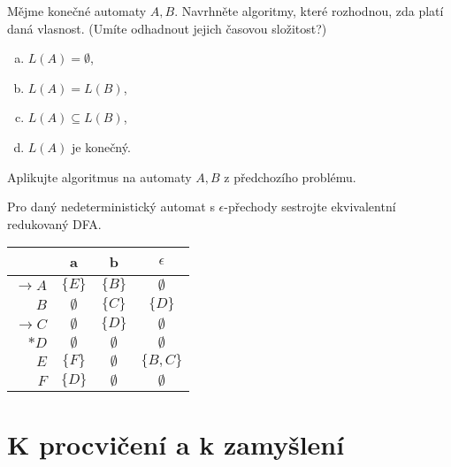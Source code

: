 \documentclass[a4paper,12pt]{amsart}
\begin{document}
\begin{problem}

    Mějme konečné automaty $A,B$. Navrhněte algoritmy, které rozhodnou, zda platí daná vlasnost. (Umíte odhadnout jejich časovou složitost?)
    
    \begin{multicols}{4}
    
        \begin{enumerate}[(a)]\setlength\itemsep{6pt}
            \item $L(A)=\emptyset$,
            \item $L(A)=L(B)$,
            \item $L(A)\subseteq L(B)$,
            \item $L(A)$ je konečný.
        \end{enumerate}

    \end{multicols}

    Aplikujte algoritmus na automaty $A,B$ z předchozího problému.

    \smallskip

\end{problem}

\begin{problem}

    Pro daný nedeterministický automat s $\epsilon$-přechody sestrojte ekvivalentní redukovaný DFA.
    
    \begin{center}
        \begin{tabular}{ r | c c c }
            & a & b & $\epsilon$ \\ \hline
            $\to A$ & $\{E\}$ & $\{B\}$ & $\emptyset$ \\
            $B$ & $\emptyset$ & $\{C\}$ & $\{D\}$ \\
            $\to C$ & $\emptyset$ & $\{D\}$ & $\emptyset$ \\
            $\ast D$ & $\emptyset$ & $\emptyset$ & $\emptyset$ \\
            $E$ & $\{F\}$ & $\emptyset$ & $\{B,C\}$\\
            $F$ & $\{D\}$ & $\emptyset$ & $\emptyset$
        \end{tabular}
    \end{center}

\end{problem}


\section*{K procvičení a k zamyšlení}
\end{document}
